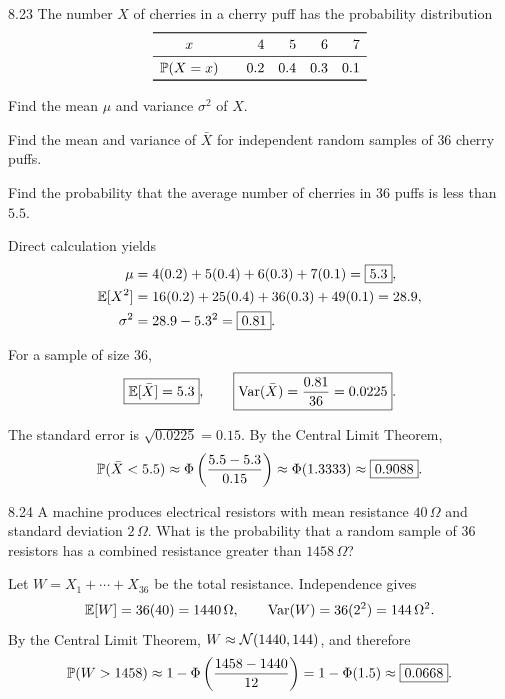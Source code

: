 \documentclass[11pt,oneside]{article}
\begin{document}
\begin{exercise}{8.23}
The number $X$ of cherries in a cherry puff has the probability distribution
\[
\begin{array}{c@{\qquad}rrrr}\toprule
x&4&5&6&7\\\midrule
\Prob(X=x)&0.2&0.4&0.3&0.1\\\bottomrule
\end{array}
\]
\begin{exercisesubparts}
\item Find the mean $\mu$ and variance $\sigma^2$ of $X$.
\item Find the mean and variance of $\bar X$ for independent random samples of $36$ cherry puffs.
\item Find the probability that the average number of cherries in $36$ puffs is less than $5.5$.
\end{exercisesubparts}
\end{exercise}
\begin{solution}
\begin{exercisesubparts}
\item Direct calculation yields
\[
\begin{aligned}
\mu&=4(0.2)+5(0.4)+6(0.3)+7(0.1)=\boxed{5.3}, \\
\mathbb{E}[X^2]&=16(0.2)+25(0.4)+36(0.3)+49(0.1)=28.9, \\
\sigma^2&=28.9-5.3^2=\boxed{0.81}.
\end{aligned}
\]
\item For a sample of size $36$,
\[
\boxed{\mathbb{E}[\bar X]=5.3}, \qquad
\boxed{\operatorname{Var}(\bar X)=\frac{0.81}{36}=0.0225}.
\]
\item The standard error is $\sqrt{0.0225}=0.15$. By the Central Limit Theorem,
\[
\mathbb{P}(\bar X<5.5)\approx\Phi\left(\frac{5.5-5.3}{0.15}\right)
\approx\Phi(1.3333)\approx\boxed{0.9088}.
\]
\end{exercisesubparts}
\end{solution}

\begin{exercise}{8.24}
A machine produces electrical resistors with mean resistance $40\,\Omega$ and standard deviation $2\,\Omega$. What is the probability that a random sample of $36$ resistors has a combined resistance greater than $1458\,\Omega$?
\end{exercise}
\begin{solution}
Let $W=X_1+\cdots+X_{36}$ be the total resistance. Independence gives
\[
\mathbb{E}[W]=36(40)=1440\,\Omega, \qquad
\operatorname{Var}(W)=36(2^2)=144\,\Omega^2.
\]
By the Central Limit Theorem, $W\approx\mathcal{N}(1440, 144)$, and therefore
\[
\mathbb{P}(W>1458)\approx1-\Phi\left(\frac{1458-1440}{12}\right)
=1-\Phi(1.5)\approx\boxed{0.0668}.
\]
\end{solution}
\end{document}
